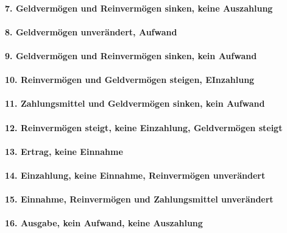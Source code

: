 \documentclass[paper=a4, fontsize=11pt]{scrartcl}
\numberwithin{equation}{section}
\numberwithin{figure}{section}
\numberwithin{table}{section}
\begin{document}
\paragraph{7. Geldvermögen und Reinvermögen sinken, keine Auszahlung}

\paragraph{8. Geldvermögen unverändert, Aufwand}

\paragraph{9. Geldvermögen und Reinvermögen sinken, kein Aufwand}

\paragraph{10. Reinvermögen und Geldvermögen steigen, EInzahlung}

\paragraph{11. Zahlungsmittel und Geldvermögen sinken, kein Aufwand}

\paragraph{12. Reinvermögen steigt, keine Einzahlung, Geldvermögen steigt}

\paragraph{13. Ertrag, keine Einnahme}
 
\paragraph{14. Einzahlung, keine Einnahme, Reinvermögen unverändert}

\paragraph{15. Einnahme, Reinvermögen und Zahlungsmittel unverändert}

\paragraph{16. Ausgabe, kein Aufwand, keine Auszahlung}
\end{document}
